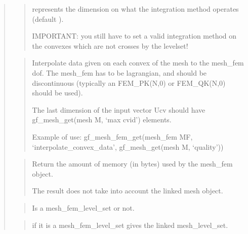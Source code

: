 \documentclass[a4paper,11pt,english]{sphinxmanual}
\begin{document}
\begin{quote}
\begin{quote}
 represents the dimension on what the integration method
operates (default ).

IMPORTANT: you still have to set a valid integration method on
the convexes which are not crosses by the levelset!
\end{quote}

\begin{quote}

Interpolate data given on each convex of the mesh to the mesh\_fem dof.
The mesh\_fem has to be lagrangian, and should be discontinuous (typically
an FEM\_PK(N,0) or FEM\_QK(N,0) should be used).

The last dimension of the input vector Ucv should have
gf\_mesh\_get(mesh M, ‘max cvid’) elements.

Example of use: gf\_mesh\_fem\_get(mesh\_fem MF, ‘interpolate\_convex\_data’, gf\_mesh\_get(mesh M, ‘quality’))
\end{quote}

\begin{quote}

Return the amount of memory (in bytes) used by the mesh\_fem object.

The result does not take into account the linked mesh object.
\end{quote}

\begin{quote}

Is a mesh\_fem\_level\_set or not.
\end{quote}

\begin{quote}

if it is a mesh\_fem\_level\_set gives the linked mesh\_level\_set.
\end{quote}

\begin{quote}


\end{quote}
\end{quote}
\end{document}
